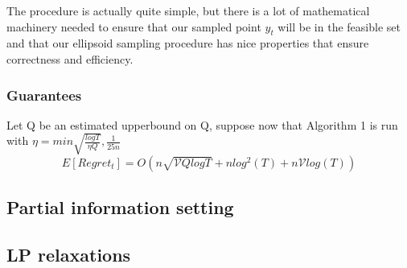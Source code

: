 The procedure is actually quite simple, but there is a lot of mathematical machinery needed to
ensure that our sampled point $y_t$ will be in the feasible set and that our ellipsoid sampling
procedure has nice properties that ensure correctness and efficiency. 

\subsubsection{Guarantees}


Let Q be an estimated upperbound on Q, suppose now that Algorithm 1 is run with
$\eta = min{\sqrt{\frac{log T}{\eta Q}}, \frac{1}{25n}}$
\begin{equation}
E[Regret_t] = O(n \sqrt{\mathcal{V}Q log T} + n log^2(T) + n \mathcal{V}log(T))
\end{equation}

\subsection{Partial information setting}
\subsection{LP relaxations}
